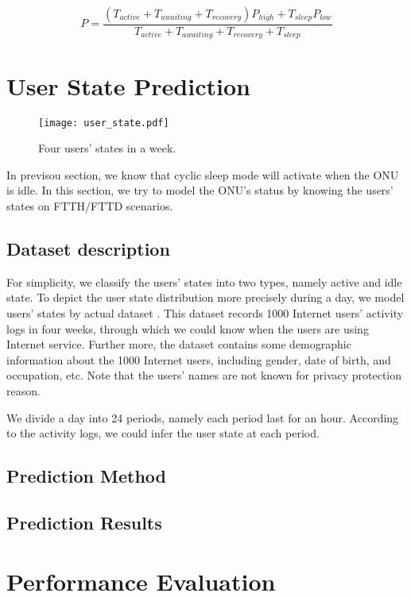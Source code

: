 \documentclass[journal]{IEEEtran}
\begin{document}
\begin{footnotesize}
\begin{equation}
P = \frac{({T_{active} + T_{awaiting} + T_{recovery}}){P_{high}} + T_{sleep}P_{low}}{T_{active} + T_{awaiting} + T_{recovery} + T_{sleep}}
\end{equation}
\end{footnotesize}

\section{User State Prediction}

\begin{figure}[t]
	\centering 
	\texttt{[image: user\_state.pdf]}\\ 
	\caption{ Four users' states in a week.}
	\label{user_state}
\end{figure}
In previsou section, we know that cyclic sleep mode will activate when the ONU is idle. In this section, we try to model the ONU's status by knowing the users' states on FTTH/FTTD scenarios.

\subsection{Dataset description}
For simplicity, we classify the users' states into two types, namely active and idle state. To depict the user state distribution more precisely during a day, we model users' states by actual dataset \cite{Datatang}. This dataset records 1000 Internet users' activity logs in four weeks, through which we could know when the users are using Internet service. Further more, the dataset contains some demographic information about the 1000 Internet users, including gender, date of birth, and occupation, etc. Note that the users' names are not known for privacy protection reason. 

We divide a day into 24 periods, namely each period last for an hour. According to the activity logs, we could infer the user state at each period.

\subsection{Prediction Method}
\subsection{Prediction Results}
\section{Performance Evaluation}
\end{document}
